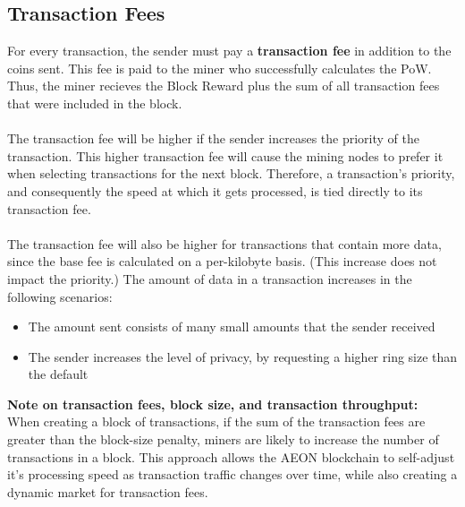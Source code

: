 \subsection{Transaction Fees}
For every transaction, the sender must pay a \textbf{transaction fee} in addition to the coins sent. This fee is paid to the miner who successfully calculates the PoW. Thus, the miner recieves the Block Reward plus the sum of all transaction fees that were included in the block.\\
\\
The transaction fee will be higher if the sender increases the priority of the transaction. This higher transaction fee will cause the mining nodes to prefer it when selecting transactions for the next block. Therefore, a transaction's priority, and consequently the speed at which it gets processed, is tied directly to its transaction fee.\\
\\
The transaction fee will also be higher for transactions that contain more data, since the base fee is calculated on a per-kilobyte basis. (This increase does not impact the priority.) The amount of data in a transaction increases in the following scenarios: 
\begin{itemize}
	\item The amount sent consists of many small amounts that the sender received
	\item The sender increases the level of privacy, by requesting a higher ring size than the default
\end{itemize}
\textbf{Note on transaction fees, block size, and transaction throughput:}\\
When creating a block of transactions, if the sum of the transaction fees are greater than the block-size penalty, miners are likely to increase the number of transactions in a block. This approach allows the AEON blockchain to self-adjust it's processing speed as transaction traffic changes over time, while also creating a dynamic market for transaction fees.\\
\\



